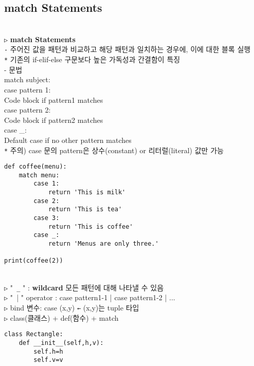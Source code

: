 \documentclass[11pt,a4paper]{article}
\begin{document}
\begin{spacing}{1.5}
\subsection{\Large\textbf{match Statements}}\\
\texttt{▷} \textbf{match Statements}\\
\texttt{-} 주어진 값을 패턴과 비교하고 해당 패턴과 일치하는 경우에, 이에 대한 블록 실행\\
\texttt{*} 기존의 if-elif-else 구문보다 높은 가독성과 간결함이 특징\\

- 문법\\
match subject:\\
\hspace*{2em}case pattern 1:\\
\hspace*{4em}Code block if pattern1 matches\\
\hspace*{2em}case pattern 2:\\
\hspace*{4em}Code block if pattern2 matches\\
\hspace*{2em}case _:\\
\hspace*{4em}Default case if no other pattern matches\\

\texttt{*} 주의) case 문의 pattern은 상수(constant) or 리터럴(literal) 값만 가능
\begin{lstlisting}[label={list:first}]
def coffee(menu):
    match menu:
        case 1:
            return 'This is milk'
        case 2:
            return 'This is tea'
        case 3:
            return 'This is coffee'
        case _:
            return 'Menus are only three.'

print(coffee(2))
\end{lstlisting}\\
\texttt{▷} "\verb| _|   " : \textbf{wildcard} 모든 패턴에 대해 나타낼 수 있음\\
\texttt{▷} "\verb| ||  " operator : case pattern1-1 \verb||| case pattern1-2 \verb||| ...\\
\texttt{▷} bind 변수: case (x,y)   \texttt{←}   (x,y)는 tuple 타입\\

\texttt{▷} class(클래스) + def(함수) + match
\begin{lstlisting}[label={list:first}]
class Rectangle:
    def __init__(self,h,v):
        self.h=h
        self.v=v


\end{lstlisting}
\end{spacing}
\end{document}

